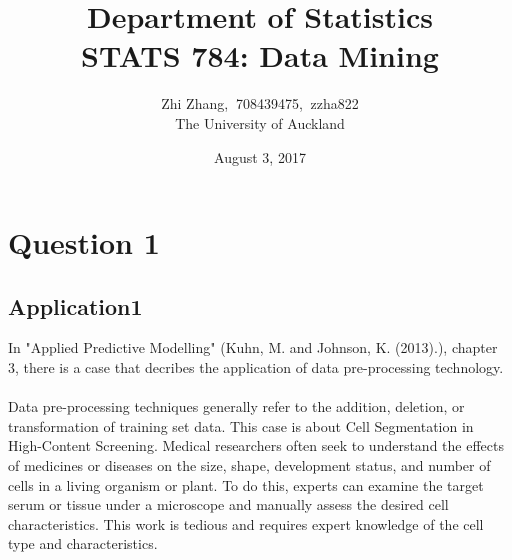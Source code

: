\documentclass{article}%
\begin{document}
\title{Department of  Statistics \\ STATS 784: Data Mining}
\author{Zhi Zhang, $\ $708439475, $\ $zzha822
\\The University of Auckland}
\date{August 3, 2017}
\maketitle


\section{Question 1}
\subsection{Application1}
In "Applied Predictive Modelling" (Kuhn, M. and Johnson, K. (2013).), chapter 3, there is a case that decribes the application of data pre-processing technology. \\\\
\indent Data pre-processing techniques generally refer to the addition, deletion, or transformation of training set data. This case is about Cell Segmentation in High-Content Screening. Medical researchers often seek to understand the effects of medicines or diseases on the size, shape, development status, and number of cells in a living organism or plant. To do this, experts can examine the target serum or tissue under a microscope and manually assess the desired cell characteristics. This work is tedious and requires expert knowledge of the cell type and characteristics.

%
\end{document}
